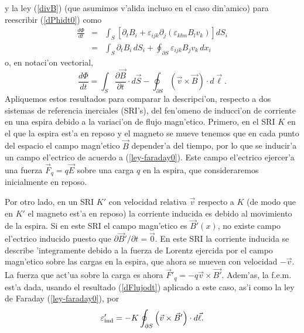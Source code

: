y la ley (\ref{divB}) (que asumimos v'alida incluso en el caso din'amico) para reescribir (\ref{dPhidt0}) como
\begin{eqnarray}
 \frac{d\Phi}{dt}&=&\int_S\left[\partial_tB_i+\varepsilon_{ijk}
\partial_j(\varepsilon_{klm} B_lv_k)\right] dS_i \\
&=& \int_S\partial_tB_i\, dS_i +\oint_{\partial S}\varepsilon_{ijk}
B_jv_k\,dx_i 
\end{eqnarray}
o, en notaci'on vectorial, 
\begin{equation}\label{dFlujodt}
  \frac{d\Phi}{dt}=\int_S\frac{\partial\vec{B}}{\partial
t}\cdot d\vec{S}-\oint_{\partial
S}\left(\vec{v}\times\vec{B}\right)\cdot d\vec{\ell}.
\end{equation}
Apliquemos estos resultados para comparar la descripci'on, respecto a dos sistemas de referencia inerciales (SRI's), del fen'omeno de inducci'on de corriente en una espira debido a la variaci'on de flujo magn'etico. Primero, en el SRI $K$ en el que la espira est'a en reposo y el magneto se mueve tenemos que en cada punto del espacio el campo magn'etico $\vec{B}$ depender'a del tiempo, por lo que se inducir'a un campo el'ectrico de acuerdo a (\ref{ley-faraday0}). Este campo el'ectrico ejercer'a una fuerza $\vec{F}_q=q\vec{E}$ sobre una carga $q$ en la espira, que consideraremos inicialmente en reposo. 

Por otro lado, en un SRI $K'$ con velocidad relativa $\vec{v}$ respecto a $K$ (de modo que en $K'$ el magneto est'a en reposo) la corriente inducida es debido al movimiento de la espira. Si en este SRI el campo magn'etico es $\vec{B}'(x)$, no existe campo el'ectrico inducido puesto que $\partial\vec{B}'/\partial t=\vec{0}$. En este SRI la corriente inducida se describe 'integramente debido a la fuerza de Lorentz ejercida por el campo magn'etico sobre las cargas en la espira, que ahora se mueven con velocidad $-\vec{v}$. La fuerza que act'ua sobre la carga es ahora $\vec{F}'_q=-q\vec{v}\times\vec{B'}$. Adem'as, la f.e.m. est'a dada, usando el resultado (\ref{dFlujodt}) aplicado a este caso, as'i como la ley de Faraday (\ref{ley-faraday0}), por 
\begin{equation}
\varepsilon'_{\rm ind}=-K\oint_{\partial S}\left(\vec{v}\times\vec{B}'\right)\cdot d\vec{\ell}.
\end{equation}

